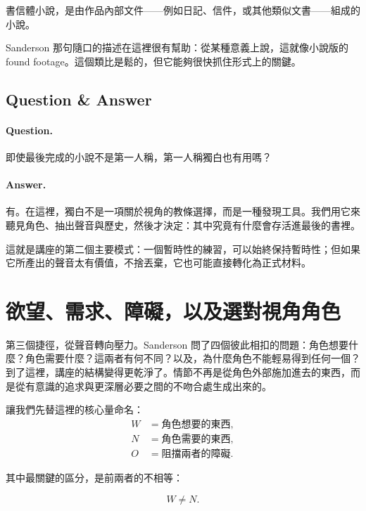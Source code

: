 \begin{definition}
書信體小說，是由作品內部文件——例如日記、信件，或其他類似文書——組成的小說。
\end{definition}

Sanderson 那句隨口的描述在這裡很有幫助：從某種意義上說，這就像小說版的 found footage。這個類比是鬆的，但它能夠很快抓住形式上的關鍵。

\subsection{Question \& Answer}

\paragraph{Question.} 即使最後完成的小說不是第一人稱，第一人稱獨白也有用嗎？

\paragraph{Answer.} 有。在這裡，獨白不是一項關於視角的教條選擇，而是一種發現工具。我們用它來聽見角色、抽出聲音與歷史，然後才決定：其中究竟有什麼會存活進最後的書裡。

這就是講座的第二個主要模式：一個暫時性的練習，可以始終保持暫時性；但如果它所產出的聲音太有價值，不捨丟棄，它也可能直接轉化為正式材料。

\section{欲望、需求、障礙，以及選對視角角色}

第三個捷徑，從聲音轉向壓力。Sanderson 問了四個彼此相扣的問題：角色想要什麼？角色需要什麼？這兩者有何不同？以及，為什麼角色不能輕易得到任何一個？到了這裡，講座的結構變得更乾淨了。情節不再是從角色外部施加進去的東西，而是從有意識的追求與更深層必要之間的不吻合處生成出來的。

讓我們先替這裡的核心量命名：
\begin{align}
W &= \text{角色想要的東西},\\
N &= \text{角色需要的東西},\\
O &= \text{阻擋兩者的障礙}.
\end{align}

其中最關鍵的區分，是前兩者的不相等：

\begin{equation}
W \neq N.
\end{equation}

